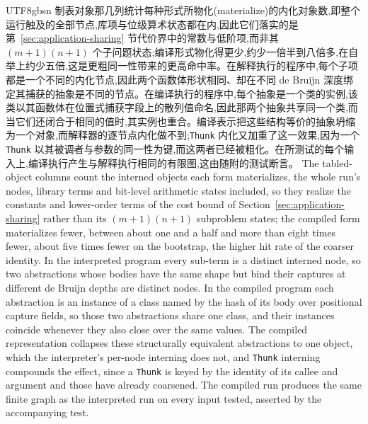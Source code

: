 \begin{CJK*}{UTF8}{gbsn}
  \ifPaperChinese
  制表对象那几列统计每种形式所物化(materialize)的内化对象数,即整个运行触及的全部节点,库项与位级算术状态都在内,因此它们落实的是第~\ref{sec:application-sharing} 节代价界中的常数与低阶项,而非其 $(m{+}1)(n{+}1)$ 个子问题状态;编译形式物化得更少,约少一倍半到八倍多,在自举上约少五倍,这是更粗同一性带来的更高命中率。在解释执行的程序中,每个子项都是一个不同的内化节点,因此两个函数体形状相同、却在不同 de Bruijn 深度绑定其捕获的抽象是不同的节点。在编译执行的程序中,每个抽象是一个类的实例,该类以其函数体在位置式捕获字段上的散列值命名,因此那两个抽象共享同一个类,而当它们还闭合于相同的值时,其实例也重合。编译表示把这些结构等价的抽象坍缩为一个对象,而解释器的逐节点内化做不到;\texttt{Thunk} 内化又加重了这一效果,因为一个 \texttt{Thunk} 以其被调者与参数的同一性为键,而这两者已经被粗化。在所测试的每个输入上,编译执行产生与解释执行相同的有限图,这由随附的测试断言。
  \else
  The tabled-object columns count the interned objects each form materializes, the whole run's nodes, library terms and bit-level arithmetic states included, so they realize the constants and lower-order terms of the cost bound of Section~\ref{sec:application-sharing} rather than its $(m{+}1)(n{+}1)$ subproblem states; the compiled form materializes fewer, between about one and a half and more than eight times fewer, about five times fewer on the bootstrap, the higher hit rate of the coarser identity. In the interpreted program every sub-term is a distinct interned node, so two abstractions whose bodies have the same shape but bind their captures at different de Bruijn depths are distinct nodes. In the compiled program each abstraction is an instance of a class named by the hash of its body over positional capture fields, so those two abstractions share one class, and their instances coincide whenever they also close over the same values. The compiled representation collapses these structurally equivalent abstractions to one object, which the interpreter's per-node interning does not, and \texttt{Thunk} interning compounds the effect, since a \texttt{Thunk} is keyed by the identity of its callee and argument and those have already coarsened. The compiled run produces the same finite graph as the interpreted run on every input tested, asserted by the accompanying test.
  \fi


\end{CJK*}
